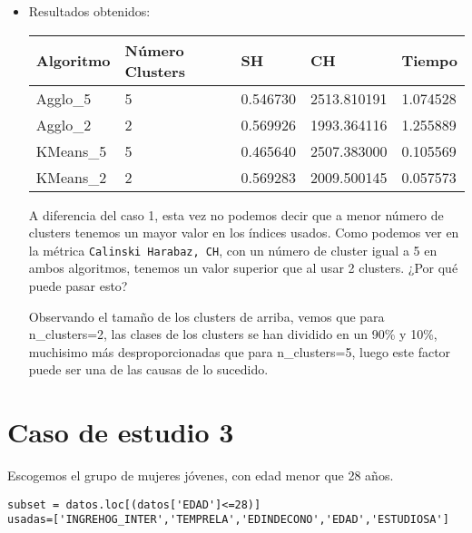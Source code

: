 \begin{itemize}
	\item Resultados obtenidos:
	
	\begin{table}[H]
		\centering
		\begin{tabular}{|l|l|l|l|l|}
			\hline
			\textbf{Algoritmo} & \textbf{Número Clusters} & \textbf{SH} & \textbf{CH} & \textbf{Tiempo} \\ \hline
			Agglo\_5           & 5                        & 0.546730    & 2513.810191 & 1.074528        \\ \hline
			Agglo\_2           & 2                        & 0.569926    & 1993.364116 & 1.255889        \\ \hline
			KMeans\_5          & 5                        & 0.465640    & 2507.383000 & 0.105569        \\ \hline
			KMeans\_2          & 2                        & 0.569283    & 2009.500145 & 0.057573        \\ \hline
		\end{tabular}%
	
	\end{table}
	
	A diferencia del caso 1, esta vez no podemos decir que a menor número de clusters tenemos un mayor valor en los índices usados. 
	Como podemos ver en la métrica \texttt{Calinski Harabaz, CH}, con un número de cluster igual a 5 en ambos algoritmos, tenemos un valor superior que al usar 2 clusters. ¿Por qué puede pasar esto?
	
	 Observando el tamaño de los clusters de arriba, vemos que para n\_clusters=2, las clases de los clusters se han dividido en un 90\% y 10\%, muchisimo más desproporcionadas que para n\_clusters=5, luego este factor puede ser una de las causas de lo sucedido.
	\end{itemize}










	\section{Caso de estudio 3}
	
	Escogemos el grupo de mujeres jóvenes, con edad menor que 28 años.
	
	\begin{lstlisting}[frame=single]
subset = datos.loc[(datos['EDAD']<=28)]
usadas=['INGREHOG_INTER','TEMPRELA','EDINDECONO','EDAD','ESTUDIOSA']
	\end{lstlisting}
	
